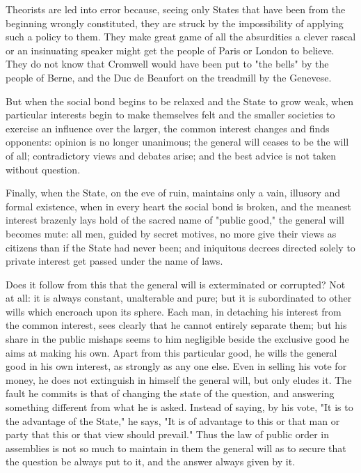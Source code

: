 \documentclass[12pt]{book}
\begin{document}
Theorists are led into error because, seeing only States that have been from the beginning wrongly constituted, they are struck by the impossibility of applying such a policy to them. They make great game of all the absurdities a clever rascal or an insinuating speaker might get the people of Paris or London to believe. They do not know that Cromwell would have been put to "the bells" by the people of Berne, and the Duc de Beaufort on the treadmill by the Genevese.

But when the social bond begins to be relaxed and the State to grow weak, when particular interests begin to make themselves felt and the smaller societies to exercise an influence over the larger, the common interest changes and finds opponents: opinion is no longer unanimous; the general will ceases to be the will of all; contradictory views and debates arise; and the best advice is not taken without question.

Finally, when the State, on the eve of ruin, maintains only a vain, illusory and formal existence, when in every heart the social bond is broken, and the meanest interest brazenly lays hold of the sacred name of "public good," the general will becomes mute: all men, guided by secret motives, no more give their views as citizens than if the State had never been; and iniquitous decrees directed solely to private interest get passed under the name of laws.

Does it follow from this that the general will is exterminated or corrupted? Not at all: it is always constant, unalterable and pure; but it is subordinated to other wills which encroach upon its sphere. Each man, in detaching his interest from the common interest, sees clearly that he cannot entirely separate them; but his share in the public mishaps seems to him negligible beside the exclusive good he aims at making his own. Apart from this particular good, he wills the general good in his own interest, as strongly as any one else. Even in selling his vote for money, he does not extinguish in himself the general will, but only eludes it. The fault he commits is that of changing the state of the question, and answering something different from what he is asked. Instead of saying, by his vote, "It is to the advantage of the State," he says, "It is of advantage to this or that man or party that this or that view should prevail." Thus the law of public order in assemblies is not so much to maintain in them the general will as to secure that the question be always put to it, and the answer always given by it.
\end{document}

